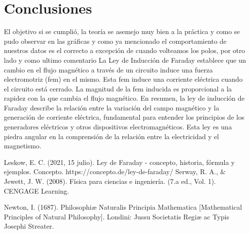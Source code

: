 \documentclass{article}
\begin{document}
\section{Conclusiones}\label{Conclusiones}				%
El objetivo si se cumplió, la teoría se asemejo muy bien a la práctica y como se pudo observar en las gráficas y como ya mencionado el comportamiento de nuestros datos es el correcto a excepción de cuando volteamos los polos, por otro lado y como ultimo comentario
La Ley de Inducción de Faraday establece que un cambio en el flujo magnético a través de un circuito induce una fuerza electromotriz (fem) en el mismo. Esta fem induce una corriente eléctrica cuando el circuito está cerrado. La magnitud de la fem inducida es proporcional a la rapidez con la que cambia el flujo magnético. En resumen, la ley de inducción de Faraday describe la relación entre la variación del campo magnético y la generación de corriente eléctrica, fundamental para entender los principios de los generadores eléctricos y otros dispositivos electromagnéticos. Esta ley es una piedra angular en la comprensión de la relación entre la electricidad y el magnetismo.

\begin{thebibliography}{9}						%
 Leskow, E. C. (2021, 15 julio). Ley de Faraday - concepto, historia, fórmula y ejemplos. Concepto. https://concepto.de/ley-de-faraday/
	Serway, R. A., $\&$ Jewett, J. W. (2008). Física para ciencias e ingeniería. (7.a
ed., Vol. 1). CENGAGE Learning.

	Newton, I. (1687). Philosophiæ Naturalis Principia Mathematica [Mathematical Principles of Natural Philosophy]. Londini: Jussu Societatis Regiæ ac Typis Josephi Streater.

\end{thebibliography}
\end{document}
